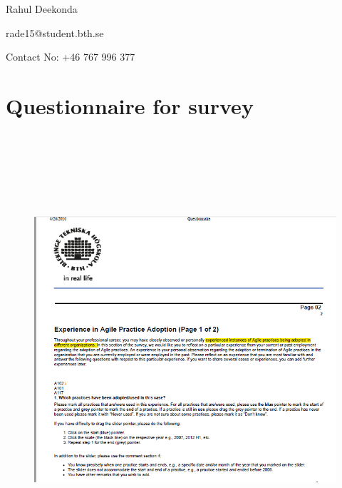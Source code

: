 \documentclass[a4paper,oneside]{bth}
\begin{document}
\begin{appendices}
\begin{flushleft}
Rahul Deekonda

rade15@student.bth.se

Contact No: +46 767 996 377
\end{flushleft}
\chapter{Questionnaire for survey} \label{appendix B}
\begin{figure}[h]
\centering

\includegraphics[width=14cm, height=16cm]{Screenshot_1.png}
\end{figure}
\begin{figure}[h]

\end{figure}
\end{appendices}
\end{document}
